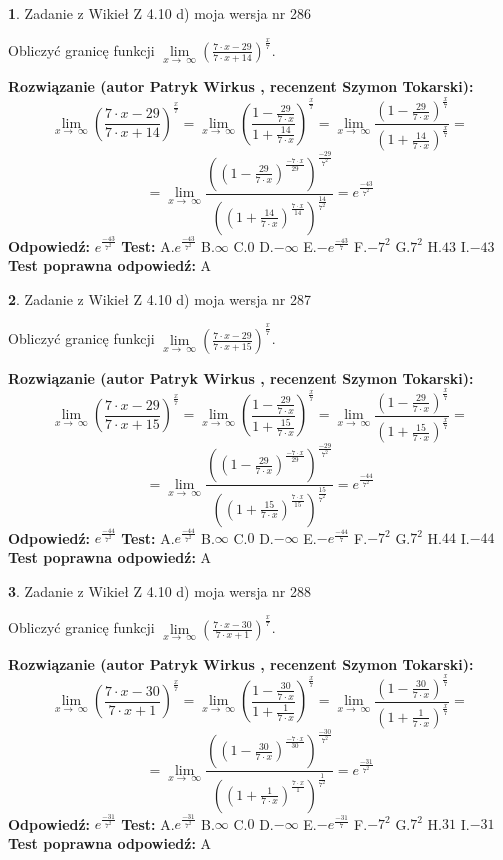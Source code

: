 \documentclass[12pt, a4paper]{article}
\theoremstyle{definition} %
\newtheorem{zad}{}
\newcommand{\zadStart}[1]{\begin{zad}#1\newline}
\newcommand{\zadStop}{\end{zad}}
\newcommand{\rozwStart}[2]{\noindent \textbf{Rozwiązanie (autor #1 , recenzent #2): }\newline}
\newcommand{\rozwStop}{\newline}
\newcommand{\odpStart}{\noindent \textbf{Odpowiedź:}\newline}
\newcommand{\odpStop}{\newline}
\newcommand{\testStart}{\noindent \textbf{Test:}\newline}
\newcommand{\testStop}{\newline}
\newcommand{\kluczStart}{\noindent \textbf{Test poprawna odpowiedź:}\newline}
\newcommand{\kluczStop}{\newline}
\begin{document}
\zadStart{Zadanie z Wikieł Z 4.10 d) moja wersja nr 286}


Obliczyć granicę funkcji  $\lim\limits_{x\to\ \infty}(\frac{7\cdot x-29}{7\cdot x+14})^{\frac{x}{7}}$.
\zadStop
\rozwStart{Patryk Wirkus}{Szymon Tokarski}
$$\lim\limits_{x\to\ \infty}(\frac{7\cdot x-29}{7\cdot x+14})^{\frac{x}{7}} = \lim\limits_{x\to\ \infty}(\frac{1-\frac{29}{7\cdot x}}{1+\frac{14}{7\cdot x}})^{\frac{x}{7}}=\lim\limits_{x\to\ \infty}\frac{(1-\frac{29}{7\cdot x})^{\frac{x}{7}}}{(1+\frac{14}{7\cdot x})^{\frac{x}{7}}}=$$
$$=\lim\limits_{x\to\ \infty}\frac{((1-\frac{29}{7\cdot x})^{\frac{-7\cdot x}{29}})^{\frac{-29}{7^{2}}}}{((1+\frac{14}{7\cdot x})^{\frac{7\cdot x}{14}})^{\frac{14}{7^{2}}}}=e^{\frac{-43}{7^{2}}}$$
\rozwStop
\odpStart
$e^{\frac{-43}{7^{2}}}$
\odpStop
\testStart
A.$e^{\frac{-43}{7^{2}}}$ B.$\infty$ C.$0$ D.$-\infty$ E.$-e^{\frac{-43}{7}}$
F.$-7^{2}$ G.$7^{2}$
H.$43$
I.$-43$
\testStop
\kluczStart
A
\kluczStop



\zadStart{Zadanie z Wikieł Z 4.10 d) moja wersja nr 287}


Obliczyć granicę funkcji  $\lim\limits_{x\to\ \infty}(\frac{7\cdot x-29}{7\cdot x+15})^{\frac{x}{7}}$.
\zadStop
\rozwStart{Patryk Wirkus}{Szymon Tokarski}
$$\lim\limits_{x\to\ \infty}(\frac{7\cdot x-29}{7\cdot x+15})^{\frac{x}{7}} = \lim\limits_{x\to\ \infty}(\frac{1-\frac{29}{7\cdot x}}{1+\frac{15}{7\cdot x}})^{\frac{x}{7}}=\lim\limits_{x\to\ \infty}\frac{(1-\frac{29}{7\cdot x})^{\frac{x}{7}}}{(1+\frac{15}{7\cdot x})^{\frac{x}{7}}}=$$
$$=\lim\limits_{x\to\ \infty}\frac{((1-\frac{29}{7\cdot x})^{\frac{-7\cdot x}{29}})^{\frac{-29}{7^{2}}}}{((1+\frac{15}{7\cdot x})^{\frac{7\cdot x}{15}})^{\frac{15}{7^{2}}}}=e^{\frac{-44}{7^{2}}}$$
\rozwStop
\odpStart
$e^{\frac{-44}{7^{2}}}$
\odpStop
\testStart
A.$e^{\frac{-44}{7^{2}}}$ B.$\infty$ C.$0$ D.$-\infty$ E.$-e^{\frac{-44}{7}}$
F.$-7^{2}$ G.$7^{2}$
H.$44$
I.$-44$
\testStop
\kluczStart
A
\kluczStop



\zadStart{Zadanie z Wikieł Z 4.10 d) moja wersja nr 288}


Obliczyć granicę funkcji  $\lim\limits_{x\to\ \infty}(\frac{7\cdot x-30}{7\cdot x+1})^{\frac{x}{7}}$.
\zadStop
\rozwStart{Patryk Wirkus}{Szymon Tokarski}
$$\lim\limits_{x\to\ \infty}(\frac{7\cdot x-30}{7\cdot x+1})^{\frac{x}{7}} = \lim\limits_{x\to\ \infty}(\frac{1-\frac{30}{7\cdot x}}{1+\frac{1}{7\cdot x}})^{\frac{x}{7}}=\lim\limits_{x\to\ \infty}\frac{(1-\frac{30}{7\cdot x})^{\frac{x}{7}}}{(1+\frac{1}{7\cdot x})^{\frac{x}{7}}}=$$
$$=\lim\limits_{x\to\ \infty}\frac{((1-\frac{30}{7\cdot x})^{\frac{-7\cdot x}{30}})^{\frac{-30}{7^{2}}}}{((1+\frac{1}{7\cdot x})^{\frac{7\cdot x}{1}})^{\frac{1}{7^{2}}}}=e^{\frac{-31}{7^{2}}}$$
\rozwStop
\odpStart
$e^{\frac{-31}{7^{2}}}$
\odpStop
\testStart
A.$e^{\frac{-31}{7^{2}}}$ B.$\infty$ C.$0$ D.$-\infty$ E.$-e^{\frac{-31}{7}}$
F.$-7^{2}$ G.$7^{2}$
H.$31$
I.$-31$
\testStop
\kluczStart
A
\kluczStop
\end{document}

